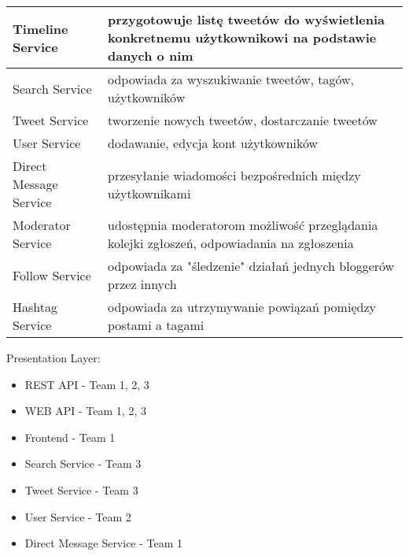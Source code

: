 \documentclass[a4paper]{article}
\begin{document}
\begin{tabular}{|p{3cm}| p{7cm}|}
\hline
\hline
Timeline Service & przygotowuje listę tweetów do wyświetlenia konkretnemu użytkownikowi na podstawie danych o nim \\
\hline
Search Service & odpowiada za wyszukiwanie tweetów, tagów, użytkowników\\
\hline
Tweet Service & tworzenie nowych tweetów, dostarczanie tweetów\\
\hline
User Service & dodawanie, edycja kont użytkowników\\
\hline
Direct Message Service & przesyłanie wiadomości bezpośrednich między użytkownikami\\
\hline
Moderator Service & udostępnia moderatorom możliwość przeglądania kolejki zgłoszeń, odpowiadania na zgłoszenia\\ \hline
Follow Service & odpowiada za "śledzenie" działań jednych bloggerów przez innych\\ \hline
Hashtag Service & odpowiada za utrzymywanie powiązań pomiędzy postami a tagami\\ \hline

\end{tabular}

Presentation Layer:
\begin{itemize}
\item {REST API - Team 1, 2, 3}
\item {WEB API - Team 1, 2, 3}
\item {Frontend - Team 1}
\item {Search Service - Team 3}

\end{itemize}
\begin{itemize}
Logic:
\item {Tweet Service - Team 3}
\item {User Service - Team 2 }
\item {Direct Message Service - Team 1} 
\end{itemize}
\end{document}
